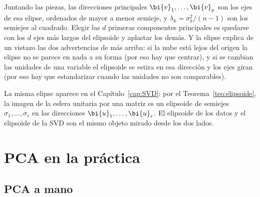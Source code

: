 Juntando las piezas, las direcciones principales $\bi{v}_1,\dots,\bi{v}_p$ son los ejes
de esa elipse, ordenados de mayor a menor semieje, y
$\lambda_k=\sigma_k^2/(n-1)$ son los semiejes al cuadrado. Elegir las $d$
primeras componentes principales es quedarse con los $d$ ejes más largos del
elipsoide y aplastar los demás. Y la elipse explica de un vistazo las dos
advertencias de más arriba: si la nube está lejos del origen la elipse no se
parece en nada a su forma (por eso hay que centrar), y si se cambian las
unidades de una variable el elipsoide se estira en esa dirección y los ejes
giran (por eso hay que estandarizar cuando las unidades no son comparables).

La misma elipse aparece en el Capítulo~\ref{cap:SVD}: por el
Teorema~\ref{teo:elipsoide}, la imagen de la esfera unitaria por una matriz es
un elipsoide de semiejes $\sigma_1,\dots,\sigma_r$ en las direcciones
$\bi{u}_1,\dots,\bi{u}_r$. El elipsoide de los datos y el elipsoide de la SVD son el
mismo objeto mirado desde los dos lados.

\section{PCA en la práctica}\label{pca-sec:practica}

\subsection{PCA a mano}

